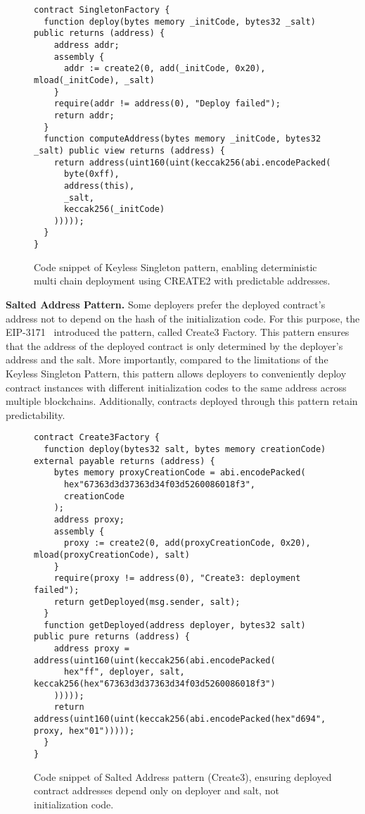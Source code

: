 \documentclass[acmsmall, screen]{acmart}
\begin{document}
	\begin{figure}[h]
		\begin{minipage}{0.95\linewidth}
			\begin{lstlisting}
contract SingletonFactory {
  function deploy(bytes memory _initCode, bytes32 _salt) public returns (address) {
    address addr;
    assembly {
      addr := create2(0, add(_initCode, 0x20), mload(_initCode), _salt)
    }
    require(addr != address(0), "Deploy failed");
    return addr;
  }
  function computeAddress(bytes memory _initCode, bytes32 _salt) public view returns (address) {
    return address(uint160(uint(keccak256(abi.encodePacked(
      byte(0xff),
      address(this),
      _salt,
      keccak256(_initCode)
    )))));
  }
}
			\end{lstlisting}
		\end{minipage}
\caption{Code snippet of Keyless Singleton pattern, enabling deterministic multi chain deployment
using CREATE2 with predictable addresses.}
		\label{list:singleton}
	\end{figure}

	\textbf{Salted Address Pattern.} Some deployers prefer the deployed contract's address not to depend
	on the hash of the initialization code. For this purpose, the EIP-3171~\cite{eip-3171} introduced
	the pattern, called Create3 Factory. This pattern ensures that the address of the deployed contract
	is only determined by the deployer's address and the salt. More importantly, compared to the limitations
	of the Keyless Singleton Pattern, this pattern allows deployers to conveniently deploy contract
	instances with different initialization codes to the same address across multiple blockchains. Additionally,
	contracts deployed through this pattern retain predictability.

	\begin{figure}[h]
		\begin{minipage}{0.95\linewidth}
			\begin{lstlisting}
contract Create3Factory {
  function deploy(bytes32 salt, bytes memory creationCode) external payable returns (address) {
    bytes memory proxyCreationCode = abi.encodePacked(
      hex"67363d3d37363d34f03d5260086018f3",
      creationCode
    );
    address proxy;
    assembly {
      proxy := create2(0, add(proxyCreationCode, 0x20), mload(proxyCreationCode), salt)
    }
    require(proxy != address(0), "Create3: deployment failed");
    return getDeployed(msg.sender, salt);
  }
  function getDeployed(address deployer, bytes32 salt) public pure returns (address) {
    address proxy = address(uint160(uint(keccak256(abi.encodePacked(
      hex"ff", deployer, salt, keccak256(hex"67363d3d37363d34f03d5260086018f3")
    )))));
    return address(uint160(uint(keccak256(abi.encodePacked(hex"d694", proxy, hex"01")))));
  }
}
			\end{lstlisting}
		\end{minipage}
		\caption{Code snippet of Salted Address pattern (Create3), ensuring deployed contract addresses
		depend only on deployer and salt, not initialization code.}
		\label{list:create3}
	\end{figure}
\end{document}
